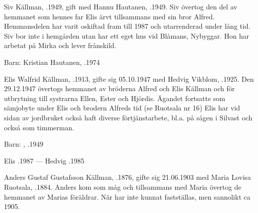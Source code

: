 


Siv Källman, .1949, gift med Hannu Hautanen, .1949. Siv övertog den del av hemmanet som hennes far Elis ärvt tillsammans med sin bror Alfred. Hemmansdelen har varit oskiftad fram till 1987 och utarrenderad under lång tid. Siv bor inte i hemgården utan har ett eget hus vid Blåmans, Nybyggar. Hon har arbetat på Mirka och lever frånskild.

Barn: Kristian Hautanen, .1974


Elis Walfrid Källman, .1913, gifte sig 05.10.1947 med Hedvig Vikblom, .1925. Den 29.12.1947 övertogs hemmanet av bröderna Alfred och Elis Källman och för utbrytning till systrarna Ellen, Ester och Hjördis. Ägandet fortsatte som sämjobyte under Elis och brodern Alfreds tid (se Ruotsala nr 16) Elis har vid sidan av jordbruket också haft diverse förtjänstarbete, bl.a. på sågen i Silvast och också som timmerman.

Barn: , .1949

Elis .1987  ---  Hedvig .1985


Anders Gustaf Gustafsson Källman, .1876, gifte sig 21.06.1903 med Maria Lovisa Ruotsala, .1884. Anders kom som måg och tillsammans med Maria övertog de hemmanet av Marias föräldrar. När har inte kunnat fastställas, men sannolikt ca 1905.
\begin{jhchildren}
  \item {}
  \item {}
  \item {}
  \item {}
  \item {}
  \item {}
  \item {}
\end{jhchildren}


